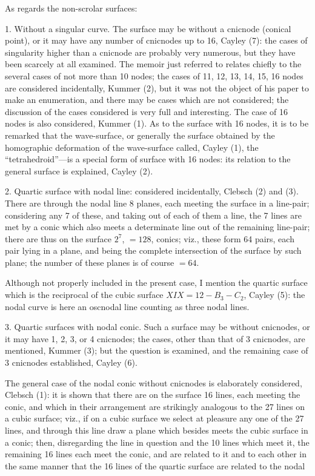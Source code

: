 \documentclass[11pt]{article}
\begin{document}
As regards the non-scrolar surfaces:

1. Without a singular curve. The surface may be without a cnicnode (conical
point), or it may have any number of cnicnodes up to 16, Cayley (7): the cases of
singularity higher than a cnicnode are probably very numerous, but they have been
scarcely at all examined. The memoir just referred to relates chiefly to the several
cases of not more than 10 nodes; the cases of 11, 12, 13, 14, 15, 16 nodes are con\-sidered
incidentally, Kummer (2), but it was not the object of his paper to make an
enumeration, and there may be cases which are not considered; the discussion of the
cases considered is very full and interesting. The case of 16 nodes is also considered,
Kummer (1). As to the surface with 16 nodes, it is to be remarked that the wave-surface,
or generally the surface obtained by the homographic deformation of the wave-surface
called, Cayley (1), the ``tetrahedroid''---is a special form of surface with 16
nodes: its relation to the general surface is explained, Cayley (2).

2. Quartic surface with nodal line: considered incidentally, Clebsch (2) and (3).
There are through the nodal line 8 planes, each meeting the surface in a line-pair;
considering any 7 of these, and taking out of each of them a line, the 7 lines are
met by a conic which also meets a determinate line out of the remaining line-pair;
there are thus on the surface $2^7$, $=128$, conics; viz., these form 64 pairs, each pair
lying in a plane, and being the complete intersection of the surface by such plane;
the number of these planes is of course $=64$.

Although not properly included in the present case, I mention the quartic surface
which is the reciprocal of the cubic surface $XIX = 12 - B_3 - C_2$, Cayley (5): the nodal
curve is here an oscnodal line counting as three nodal lines.

3. Quartic surfaces with nodal conic. Such a surface may be without cnicnodes,
or it may have 1, 2, 3, or 4 cnicnodes; the cases, other than that of 3 cnicnodes, are
mentioned, Kummer (3); but the question is examined, and the remaining case of 3
cnicnodes established, Cayley (6).

The general case of the nodal conic without cnicnodes is elaborately considered,
Clebsch (1): it is shown that there are on the surface 16 lines, each meeting the
conic, and which in their arrangement are strikingly analogous to the 27 lines on a
cubic surface; viz., if on a cubic surface we select at pleasure any one of the 27
lines, and through this line draw a plane which besides meets the cubic surface in a
conic; then, disregarding the line in question and the 10 lines which meet it, the
remaining 16 lines each meet the conic, and are related to it and to each other in
the same manner that the 16 lines of the quartic surface are related to the nodal
\end{document}
